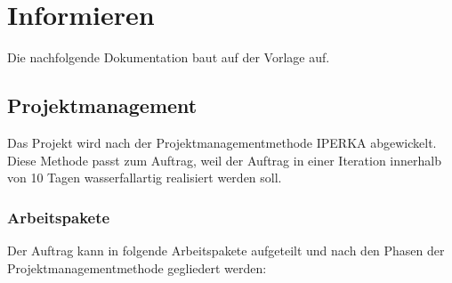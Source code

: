 \chapter{Informieren}

Die nachfolgende Dokumentation baut auf der Vorlage \cite{Buhler_ipa-template_2022} auf.

\section{Projektmanagement}

Das Projekt wird nach der Projektmanagementmethode IPERKA abgewickelt. Diese Methode passt zum Auftrag, weil der Auftrag in einer Iteration innerhalb von 10 Tagen wasserfallartig realisiert werden soll.

\subsection{Arbeitspakete}

Der Auftrag kann in folgende Arbeitspakete aufgeteilt und nach den Phasen der Projektmanagementmethode gegliedert werden:

